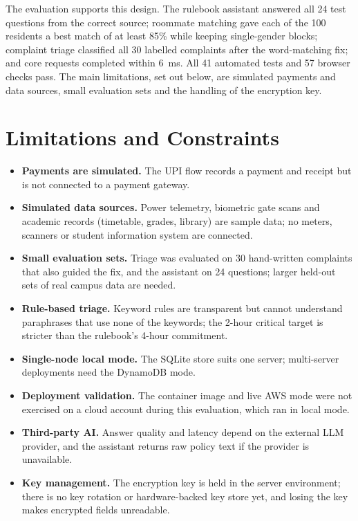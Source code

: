 \documentclass[12pt,a4paper,oneside]{report}
\begin{document}
The evaluation supports this design. The rulebook assistant answered all 24 test questions from the correct source;
roommate matching gave each of the 100 residents a best match of at least 85\% while keeping single-gender blocks;
complaint triage classified all 30 labelled complaints after the word-matching fix; and core requests completed within
6~ms. All 41 automated tests and 57 browser checks pass. The main limitations, set out below, are simulated payments
and data sources, small evaluation sets and the handling of the encryption key.

\section{Limitations and Constraints}\label{sec:limits}
\begin{itemize}
  \item \textbf{Payments are simulated.} The UPI flow records a payment and receipt but is not connected to a payment
  gateway.
  \item \textbf{Simulated data sources.} Power telemetry, biometric gate scans and academic records (timetable, grades,
  library) are sample data; no meters, scanners or student information system are connected.
  \item \textbf{Small evaluation sets.} Triage was evaluated on 30 hand-written complaints that also guided the fix, and
  the assistant on 24 questions; larger held-out sets of real campus data are needed.
  \item \textbf{Rule-based triage.} Keyword rules are transparent but cannot understand paraphrases that use none of
  the keywords; the 2-hour critical target is stricter than the rulebook's 4-hour commitment.
  \item \textbf{Single-node local mode.} The SQLite store suits one server; multi-server deployments need the DynamoDB
  mode.
  \item \textbf{Deployment validation.} The container image and live AWS mode were not exercised on a cloud account
  during this evaluation, which ran in local mode.
  \item \textbf{Third-party AI.} Answer quality and latency depend on the external LLM provider, and the assistant
  returns raw policy text if the provider is unavailable.
  \item \textbf{Key management.} The encryption key is held in the server environment; there is no key
  rotation or hardware-backed key store yet, and losing the key makes encrypted fields unreadable.
\end{itemize}
\end{document}
